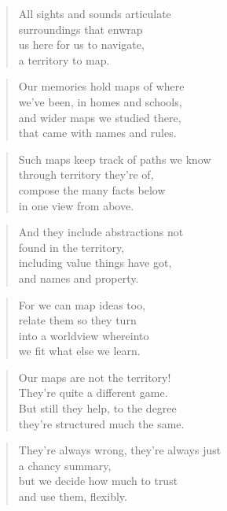 \documentclass[14pt,a4paper]{article}
\begin{document}
\begin{verse}
All sights and sounds articulate\\
surroundings that enwrap\\
us here for us to navigate,\\
a territory to map.
\end{verse}

\begin{verse}
Our memories hold maps of where\\
we’ve been, in homes and schools,\\
and wider maps we studied there,\\
that came with names and rules.
\end{verse}

\begin{verse}
Such maps keep track of paths we know\\
through territory they’re of,\\
compose the many facts below\\
in one view from above.
\end{verse}

\begin{verse}
And they include abstractions not\\
found in the territory,\\
including value things have got,\\
and names and property.
\end{verse}

\begin{verse}
For we can map ideas too,\\
relate them so they turn\\
into a worldview whereinto\\
we fit what else we learn.
\end{verse}

\begin{verse}
Our maps are not the territory!\\
They’re quite a different game.\\
But still they help, to the degree\\
they’re structured much the same.
\end{verse}

\begin{verse}
They’re always wrong, they’re always just\\
a chancy summary,\\
but we decide how much to trust\\
and use them, flexibly.
\end{verse}
\end{document}
